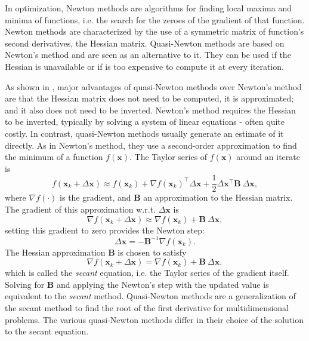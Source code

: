 In optimization, Newton methods are algorithms for finding local maxima
and minima of functions, i.e. the search for the zeroes of the gradient
of that function. Newton methods are characterized by the use of a
symmetric matrix of function's second derivatives, the Hessian matrix.
Quasi-Newton methods are based on Newton's method and are seen as an
alternative to it. They can be used if the Hessian is unavailable or if
is too expensive to compute it at every iteration.

As shown in , major advantages of
quasi-Newton methods over Newton's method are that the Hessian matrix
does not need to be computed, it is approximated; and it also does not
need to be inverted. Newton's method requires the Hessian to be
inverted, typically by solving a system of linear equations - often
quite costly. In contrast, quasi-Newton methods usually generate an
estimate of it directly. As in Newton's method, they use a second-order
approximation to find the minimum of a function \(f(\mathbf{x})\). The
Taylor series of \(f(\mathbf{x})\) around an iterate is
\[
  f(\mathbf{x}_{k} + \Delta\mathbf{x})\approx
  f(\mathbf{x}_{k}) + \nabla f(\mathbf{x}_{k})^{\top}\Delta\mathbf{x} +
  \frac{1}{2} \Delta\mathbf{x}^{\top}\mathbf{B}~\Delta\mathbf{x},
\]
where \(\nabla f(\cdot)\) is the gradient, and \(\mathbf{B}\) an
approximation to the Hessian matrix. The gradient of this approximation
w.r.t. \(\Delta\mathbf{x}\) is
\[
  \nabla f(\mathbf{x}_{k} + \Delta\mathbf{x}) \approx
  \nabla f(\mathbf{x}_{k}) + \mathbf{B}~\Delta\mathbf{x},
\]
setting this gradient to zero provides the Newton step:
\[
  \Delta\mathbf{x} = - \mathbf{B}^{-1}\nabla f(\mathbf{x}_{k}).
\]
The Hessian approximation \(\mathbf{B}\) is chosen to satisfy
\[
  \nabla f(\mathbf{x}_{k} + \Delta\mathbf{x}) =
  \nabla f(\mathbf{x}_{k}) + \mathbf{B}~\Delta\mathbf{x},
\]
which is called the \textit{secant} equation, i.e. the Taylor series of
the gradient itself. Solving for \(\mathbf{B}\) and applying the
Newton's step with the updated value is equivalent to the
\textit{secant} method. Quasi-Newton methods are a generalization of the
secant method to find the root of the first derivative for
multidimensional problems. The various quasi-Newton methods differ in
their choice of the solution to the secant equation.

